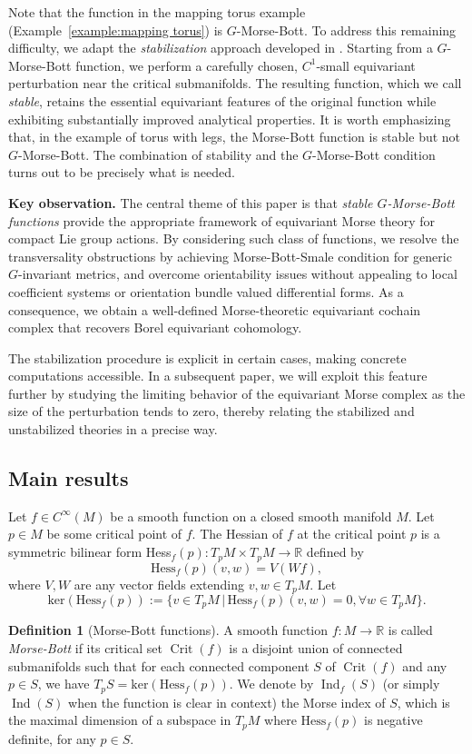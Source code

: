 \documentclass[11pt]{amsart}
\theoremstyle{definition}
\newtheorem{definition}[theorem]{Definition}
\numberwithin{equation}{subsection}
\DeclareMathOperator{\ind}{Ind}
\DeclareMathOperator{\crit}{Crit}
\begin{document}
Note that the function in the mapping torus example (Example~\ref{example:mapping torus}) is $G$-Morse-Bott.  To address this remaining difficulty, we adapt the \emph{stabilization} approach developed in \cite{mayer1989Ginvariant,bao2024morse}.  Starting from a $G$-Morse-Bott function, we perform a carefully chosen, $C^1$-small equivariant perturbation near the critical submanifolds.  The resulting function, which we call \emph{stable}, retains the essential equivariant features of the original function while exhibiting substantially improved analytical properties.  It is worth emphasizing that, in the example of torus with legs, the Morse-Bott function is stable but not $G$-Morse-Bott. The combination of stability and the $G$-Morse-Bott condition turns out to be precisely what is needed.

\medskip

\noindent
\textbf{Key observation.}
The central theme of this paper is that \emph{stable $G$-Morse-Bott functions} provide the appropriate framework of equivariant Morse theory for compact Lie group actions. By considering such class of functions, we resolve the transversality obstructions by achieving Morse-Bott-Smale condition for generic $G$-invariant metrics, and overcome orientability issues without appealing to local coefficient systems or orientation bundle valued differential forms.  As a consequence, we obtain a well-defined Morse-theoretic equivariant cochain complex that recovers Borel equivariant cohomology.

The stabilization procedure is explicit in certain cases, making concrete computations accessible.  In a subsequent paper, we will exploit this feature further by studying the limiting behavior of the equivariant Morse complex as the size of the perturbation tends to zero, thereby relating the stabilized and unstabilized theories in a precise way.


\subsection{Main results}
Let $f\in C^\infty(M)$ be a smooth function on a closed smooth manifold $M$. Let $p\in M$ be some critical point of $f$. The Hessian of $f$ at the critical point $p$ is a symmetric bilinear form Hess$_f(p):T_pM\times T_pM\rightarrow \mathbb{R}$ defined by \[\text{Hess}_f(p)(v,w)=V(Wf),\]where $V,W$ are any vector fields extending $v,w\in T_pM$. Let \[\text{ker}(\text{Hess}_f(p)):=\{v\in T_pM\,|\,\text{Hess}_f(p)(v,w)=0,\forall w\in T_pM\}.\]
\begin{definition}[Morse-Bott functions]
    A smooth function $f:M\to \mathbb{R}$ is called \emph{Morse-Bott} if its critical set $\crit(f)$ is a disjoint union of connected submanifolds such that for each connected component $S$ of $\crit(f)$ and any $p\in S$, we have $T_pS=\text{ker}(\text{Hess}_f(p))$. We denote by $\ind_f(S)$ (or simply $\ind (S)$ when the function is clear in context) the Morse index of $S$, which is the maximal dimension of a subspace in $T_pM$ where $\text{Hess}_f(p)$ is negative definite, for any $p\in S$.
\end{definition}
\end{document}
